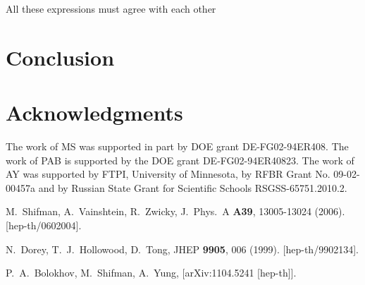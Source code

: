 \documentclass[epsfig,12pt]{article}
\begin{document}
\vspace{0.2cm}
       All these expressions must agree with each other

\newpage

\section{Conclusion}
\label{conclu}
\setcounter{equation}{0}

\section*{Acknowledgments}
The work of MS was supported in part by DOE
grant DE-FG02-94ER408. 
The work of PAB is supported by the DOE grant DE-FG02-94ER40823.
The work of AY was  supported
by  FTPI, University of Minnesota,
by RFBR Grant No. 09-02-00457a
and by Russian State Grant for
Scientific Schools RSGSS-65751.2010.2.
	
	

\begin{thebibliography}{99}

  M.~Shifman, A.~Vainshtein, R.~Zwicky,
  J.\ Phys.\ A {\bf A39}, 13005-13024 (2006).
  [hep-th/0602004].

  N.~Dorey, T.~J.~Hollowood, D.~Tong,
  JHEP {\bf 9905}, 006 (1999).
  [hep-th/9902134].

  P.~A.~Bolokhov, M.~Shifman, A.~Yung,
    [arXiv:1104.5241 [hep-th]].

  

\end{thebibliography}
\end{document}
